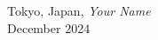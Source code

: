 \preface
\lipsum[20]

\vspace{\baselineskip}
 \begin{flushright}\noindent
   Tokyo, Japan, \hfill {\it Your Name}\\
   December 2024 \hfill %
 \end{flushright}


